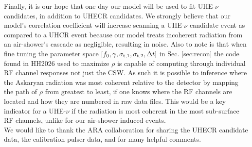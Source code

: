 \documentclass[amsmath,amssymb,aps,prd,10pt,twocolumn,showkeys]{revtex4}
\begin{document}
Finally, it is our hope that one day our model will be used to fit UHE-$\nu$ candidates, in addition to UHECR candidates. We strongly believe that our model's correlation coefficient will increase scanning a UHE-$\nu$ candidate event as compared to a UHCR event because our model treats incoherent radiation from an air-shower's cascade as negligible, resulting in noise. Also to note is that when fine tuning the parameter space $[f_0,\gamma,\sigma_{\rm t,1},\sigma_{\rm t,2},\Delta t]$ in Sec. \ref{sec:recon} the code found in HH2026 \cite{hansonnoyearcomplex-ae0} used to maximize $\rho$ is capable of computing through individual RF channel responses not just the CSW. As such it is possible to inference where the Askaryan radiation was most coherent relative to the detector by mapping the path of $\rho$ from greatest to least, if one knows where the RF channels are located and how they are numbered in raw data files. This would be a key indicator for a UHE-$\nu$ if the radiation is most coherent in the most sub-surface RF channels, unlike for our air-shower induced events. \\

\centering
We would like to thank the ARA collaboration for sharing the UHECR candidate data, the calibration pulser data, and for many helpful comments.


\newpage


\end{document}
